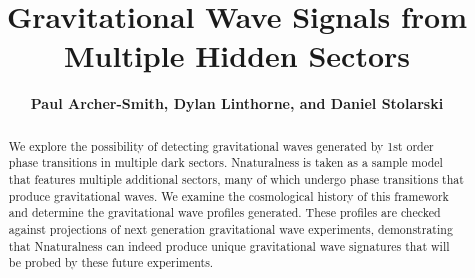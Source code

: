 \documentclass[nofootinbib,twocolumn,preprintnumbers]{revtex4-1}
\begin{document}
\def\lsim{\mathrel{\rlap{\lower4pt\hbox{\hskip1pt$\sim$}}
  \raise1pt\hbox{$<$}}}
\def\gsim{\mathrel{\rlap{\lower4pt\hbox{\hskip1pt$\sim$}}
  \raise1pt\hbox{$>$}}}
\newcommand{\vev}[1]{ \left\langle {#1} \right\rangle }
\newcommand{\bra}[1]{ \langle {#1} | }
\newcommand{\ket}[1]{ | {#1} \rangle }
\newcommand{\ev}{ {\rm eV} }
\newcommand{\kev}{{\rm keV}}
\newcommand{\mev}{{\rm MeV}}
\newcommand{\gev}{{\mathrm GeV}}
\newcommand{\tev}{{\rm TeV}}
\newcommand{\mpl}{$M_{Pl}$}
\newcommand{\mw}{$M_{W}$}
\newcommand{\Ft}{F_{T}}
\newcommand{\Zparity}{\mathbb{Z}_2}
\newcommand{\BLambda}{\boldsymbol{\lambda}}
\newcommand{\met}{\;\not\!\!\!{E}_T}
\newcommand{\beq}{\begin{equation}}
\newcommand{\eeq}{\end{equation}}
\newcommand{\bea}{\begin{eqnarray}}
\newcommand{\eea}{\end{eqnarray}}
\newcommand{\nn}{\nonumber}
\newcommand{\hc}{\mathrm{h.c.}}
\newcommand{\eps}{\epsilon}
\newcommand{\bwt}{\begin{widetext}}
\newcommand{\ewt}{\end{widetext}}
\newcommand{\draftnote}[1]{{\bf\color{blue} #1}}

\newcommand{\cO}{{\cal O}}
\newcommand{\cL}{{\cal L}}
\newcommand{\cM}{{\cal M}}

\newcommand{\fref}[1]{Fig.~\ref{fig:#1}} 
\newcommand{\eref}[1]{Eq.~\eqref{eq:#1}} 
\newcommand{\aref}[1]{Appendix~\ref{app:#1}}
\newcommand{\sref}[1]{Section~\ref{sec:#1}}
\newcommand{\tref}[1]{Table~\ref{tab:#1}}

\title{\LARGE{{\bf{Gravitational Wave Signals from Multiple Hidden Sectors} \\
}}}
\author{{\bf {Paul Archer-Smith, Dylan Linthorne, and Daniel Stolarski}}}






\begin{abstract}
We explore the possibility of detecting gravitational waves generated by 1st order phase transitions in multiple dark sectors. Nnaturalness is taken as a sample model that features multiple additional sectors, many of which undergo phase transitions that produce gravitational waves. We examine the cosmological history of this framework and determine the gravitational wave profiles generated. These profiles are checked against projections of next generation gravitational wave experiments, demonstrating that Nnaturalness can indeed produce unique gravitational wave signatures that will be probed by these future experiments. 
\end{abstract}
\end{document}
